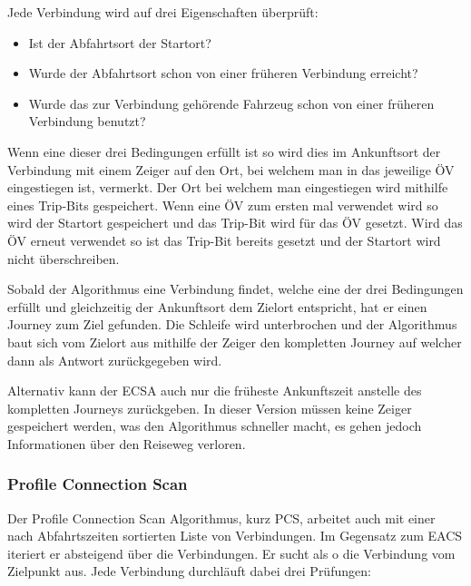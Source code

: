 Jede Verbindung wird auf drei Eigenschaften überprüft:
\begin{itemize}
	\item Ist der Abfahrtsort der Startort?
	\item Wurde der Abfahrtsort schon von einer früheren Verbindung erreicht?
	\item Wurde das zur Verbindung gehörende Fahrzeug schon von einer früheren Verbindung benutzt?
\end{itemize}
Wenn eine dieser drei Bedingungen erfüllt ist so wird dies im Ankunftsort der Verbindung mit einem Zeiger auf den Ort, bei welchem man in das jeweilige ÖV eingestiegen ist, vermerkt. Der Ort bei welchem man eingestiegen wird mithilfe eines Trip-Bits gespeichert. Wenn eine ÖV zum ersten mal verwendet wird so wird der Startort gespeichert und das Trip-Bit wird für das ÖV gesetzt. Wird das ÖV erneut verwendet so ist das Trip-Bit bereits gesetzt und der Startort wird nicht überschreiben. 

Sobald der Algorithmus eine Verbindung findet, welche eine der drei Bedingungen erfüllt und gleichzeitig der Ankunftsort dem Zielort entspricht, hat er einen Journey zum Ziel gefunden. Die Schleife wird unterbrochen und der Algorithmus baut sich vom Zielort aus mithilfe der Zeiger den kompletten Journey auf welcher dann als Antwort zurückgegeben wird.

Alternativ kann der ECSA auch nur die früheste Ankunftszeit anstelle des kompletten Journeys zurückgeben. In dieser Version müssen keine Zeiger gespeichert werden, was den Algorithmus schneller macht, es gehen jedoch Informationen über den Reiseweg verloren.

\subsubsection{Profile Connection Scan}
Der Profile Connection Scan Algorithmus, kurz PCS, arbeitet auch mit einer nach Abfahrtszeiten sortierten Liste von Verbindungen. Im Gegensatz zum EACS iteriert er absteigend über die Verbindungen. Er sucht als o die Verbindung vom Zielpunkt aus. Jede Verbindung durchläuft dabei drei Prüfungen:

